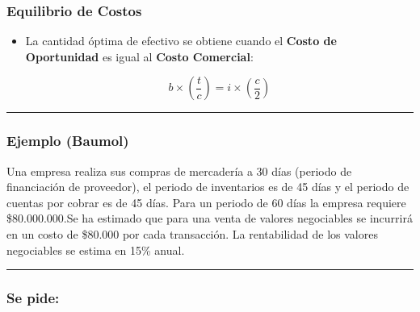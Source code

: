 \documentclass[
  letterpaper,
  DIV=11,
  numbers=noendperiod]{scrartcl}
\begin{document}
\subsubsection{Equilibrio de Costos}\label{equilibrio-de-costos}

\begin{itemize}
\item
  La cantidad óptima de efectivo se obtiene cuando el \textbf{Costo de
  Oportunidad} es igual al \textbf{Costo Comercial}:

  \[ 
  b \times \left( \frac{t}{c} \right) = i \times \left( \frac{c}{2} \right)
  \]
\end{itemize}

\begin{center}\rule{0.5\linewidth}{0.5pt}\end{center}

\subsubsection{Ejemplo (Baumol)}\label{ejemplo-baumol}

Una empresa realiza sus compras de mercadería a 30 días (periodo de
financiación de proveedor), el periodo de inventarios es de 45 días y el
periodo de cuentas por cobrar es de 45 días. Para un periodo de 60 días
la empresa requiere \$80.000.000.Se ha estimado que para una venta de
valores negociables se incurrirá en un costo de \$80.000 por cada
transacción. La rentabilidad de los valores negociables se estima en
15\% anual.

\begin{center}\rule{0.5\linewidth}{0.5pt}\end{center}

\subsubsection{Se pide:}\label{se-pide}
\end{document}
